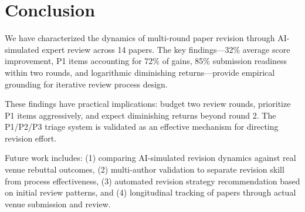 \section{Conclusion}

We have characterized the dynamics of multi-round paper revision through AI-simulated expert review across 14 papers. The key findings---32\% average score improvement, P1 items accounting for 72\% of gains, 85\% submission readiness within two rounds, and logarithmic diminishing returns---provide empirical grounding for iterative review process design.

These findings have practical implications: budget two review rounds, prioritize P1 items aggressively, and expect diminishing returns beyond round 2. The P1/P2/P3 triage system is validated as an effective mechanism for directing revision effort.

Future work includes: (1) comparing AI-simulated revision dynamics against real venue rebuttal outcomes, (2) multi-author validation to separate revision skill from process effectiveness, (3) automated revision strategy recommendation based on initial review patterns, and (4) longitudinal tracking of papers through actual venue submission and review.
